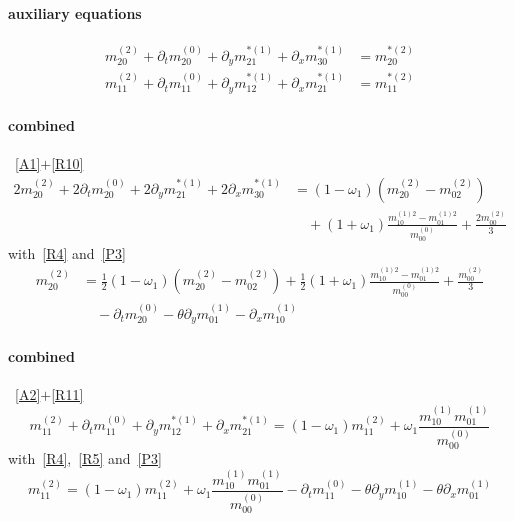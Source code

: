 \documentclass{article}
\begin{document}
  \paragraph{auxiliary equations}
  \begin{align}
    m_{20}^{(2)} + \partial_t m_{20}^{(0)} + \partial_y m_{21}^{*(1)} + \partial_x m_{30}^{*(1)} &= m_{20}^{*(2)} \label{A1}\tag{A1} \\
    m_{11}^{(2)} + \partial_t m_{11}^{(0)} + \partial_y m_{12}^{*(1)} + \partial_x m_{21}^{*(1)} &= m_{11}^{*(2)} \label{A2}\tag{A2}
  \end{align}

  \paragraph{combined}~\eqref{A1}$+$\eqref{R10}
  \begin{equation*}
    \begin{aligned}
      2m_{20}^{(2)} + 2\partial_t m_{20}^{(0)} + 2\partial_y m_{21}^{*(1)} + 2\partial_x m_{30}^{*(1)}
      &= (1-\omega_1) (m_{20}^{(2)}-m_{02}^{(2)})
      \\&\quad
      + (1+\omega_1)\frac{ m_{10}^{(1)2} - m_{01}^{(1)2}}{m_{00}^{(0)}} + \frac{2 m_{00}^{(2)}}{3}
    \end{aligned}
  \end{equation*}
  with~\eqref{R4} and~\eqref{P3}
  \begin{equation}
    \label{C1}\tag{C1}
    \begin{aligned}
      m_{20}^{(2)} &= \frac{1}{2}(1-\omega_1) (m_{20}^{(2)}-m_{02}^{(2)})
      + \frac{1}{2}(1+\omega_1)\frac{ m_{10}^{(1)2} - m_{01}^{(1)2}}{m_{00}^{(0)}} + \frac{ m_{00}^{(2)}}{3}
      \\&\quad
      - \partial_t m_{20}^{(0)} - \theta\partial_y m_{01}^{(1)} - \partial_x m_{10}^{(1)}
    \end{aligned}
  \end{equation}
  \paragraph{combined}~\eqref{A2}$+$\eqref{R11}
  \begin{equation*}
    m_{11}^{(2)} + \partial_t m_{11}^{(0)} + \partial_y m_{12}^{*(1)} + \partial_x m_{21}^{*(1)} = (1-\omega_1)m_{11}^{(2)} + \omega_1 \frac{ m_{10}^{(1)}m_{01}^{(1)}}{m_{00}^{(0)}}
  \end{equation*}
  with~\eqref{R4},~\eqref{R5} and~\eqref{P3}
  \begin{equation}
    \label{C2}\tag{C2}
    m_{11}^{(2)} = (1-\omega_1)m_{11}^{(2)} + \omega_1 \frac{ m_{10}^{(1)}m_{01}^{(1)}}{m_{00}^{(0)}}  - \partial_t m_{11}^{(0)} - \theta\partial_y m_{10}^{(1)} - \theta\partial_x m_{01}^{(1)}
  \end{equation}
\end{document}
